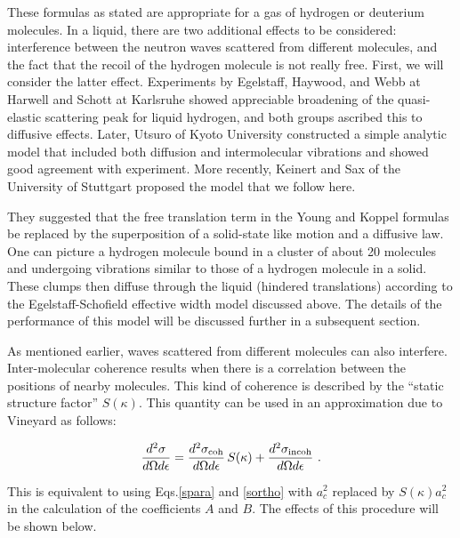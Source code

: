 These formulas as stated are appropriate for a gas of hydrogen or
deuterium molecules.  In a liquid, there are two additional effects to
be considered: interference between the neutron waves scattered from
different molecules, and the fact that the recoil of the hydrogen
molecule is not really free.  First, we will consider the latter
effect.  Experiments by Egelstaff, Haywood, and Webb at
Harwell\cite{EHW} and Schott at Karlsruhe\cite{Schott} showed
appreciable broadening of the quasi-elastic scattering peak for liquid
hydrogen, and both groups ascribed this to diffusive effects.  Later,
Utsuro of Kyoto University constructed a simple analytic
model\cite{Utsuro} that included both diffusion and intermolecular
vibrations and showed good agreement with experiment.  More recently,
Keinert and Sax of the University of Stuttgart proposed the
model\cite{Keinert} that we follow here.

They suggested that the free translation term in the Young and Koppel
formulas be replaced by the superposition of a solid-state like motion
and a diffusive law.  One can picture a hydrogen
molecule bound in a cluster of about 20 molecules and undergoing
vibrations similar to those of a hydrogen molecule in a solid.  These
clumps then diffuse through the liquid (hindered translations) according
to the Egelstaff-Schofield effective width model discussed above.  The
details of the performance of this model will be discussed further
in a subsequent section.

As mentioned earlier, waves scattered from different molecules can also
interfere.  Inter-molecular coherence results when there is a correlation
between the positions of nearby molecules.  This kind of coherence is described by the
``static structure factor'' $S(\kappa)$.
This quantity can be used in an approximation due to
Vineyard as follows:

\begin{equation}
   \frac{d^2\sigma}{d\Omega d\epsilon}
   =\frac{d^2\sigma_{\rm coh}}{d\Omega d\epsilon}\,S(\kappa)
     +\frac{d^2\sigma_{\rm incoh}}{d\Omega d\epsilon}\,\,.
\end{equation}

\noindent
This is equivalent to using Eqs.\ref{spara} and \ref{sortho} with
$a_c^2$ replaced by $S(\kappa)a_c^2$ in the calculation of the coefficients
$A$ and $B$.  The effects of this procedure will be shown below.


